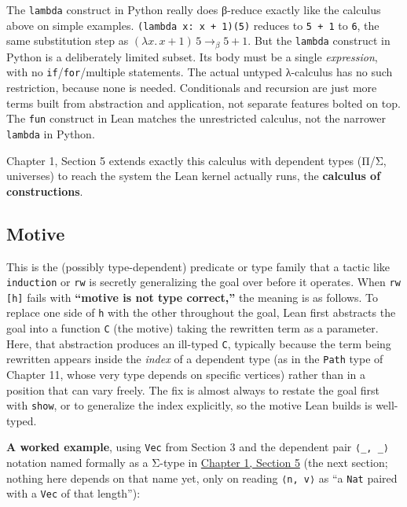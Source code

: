 \begin{progcorner}

The \texttt{lambda} construct in Python really does β-reduce exactly like the calculus above on simple examples. \texttt{(lambda x: x + 1)(5)} reduces to \texttt{5 + 1} to \texttt{6}, the same substitution step as \((\lambda x.\, x + 1)\, 5 \to_\beta 5 + 1\). But the \texttt{lambda} construct in Python is a deliberately limited subset. Its body must be a single \emph{expression}, with no \texttt{if}/\texttt{for}/multiple statements. The actual untyped λ-calculus has no such restriction, because none is needed. Conditionals and recursion are just more terms built from abstraction and application, not separate features bolted on top. The \texttt{fun} construct in Lean matches the unrestricted calculus, not the narrower \texttt{lambda} in Python.

\end{progcorner}

Chapter 1, Section 5 extends exactly this calculus with dependent types (Π/Σ, universes) to reach the system the Lean kernel actually runs, the \textbf{calculus of constructions}.

\subsection{Motive}\label{sec:01-basics:04-terminology:5}

This is the (possibly type-dependent) predicate or type family that a tactic like \texttt{induction} or \texttt{rw} is secretly generalizing the goal over before it operates. When \texttt{rw [h]} fails with \textbf{``motive is not type correct,''} the meaning is as follows. To replace one side of \texttt{h} with the other throughout the goal, Lean first abstracts the goal into a function \texttt{C} (the motive) taking the rewritten term as a parameter. Here, that abstraction produces an ill-typed \texttt{C}, typically because the term being rewritten appears inside the \emph{index} of a dependent type (as in the \texttt{Path} type of Chapter 11, whose very type depends on specific vertices) rather than in a position that can vary freely. The fix is almost always to restate the goal first with \texttt{show}, or to generalize the index explicitly, so the motive Lean builds is well-typed.

\textbf{A worked example}, using \texttt{Vec} from Section 3 and the dependent pair \texttt{⟨\_\allowbreak{}, \_\allowbreak{}⟩} notation named formally as a Σ-type in \hyperref[sec:01-basics:05-pi-sigma-and-coc:1]{Chapter 1, Section 5} (the next section; nothing here depends on that name yet, only on reading \texttt{⟨n, v⟩} as ``a \texttt{Nat} paired with a \texttt{Vec} of that length''):

